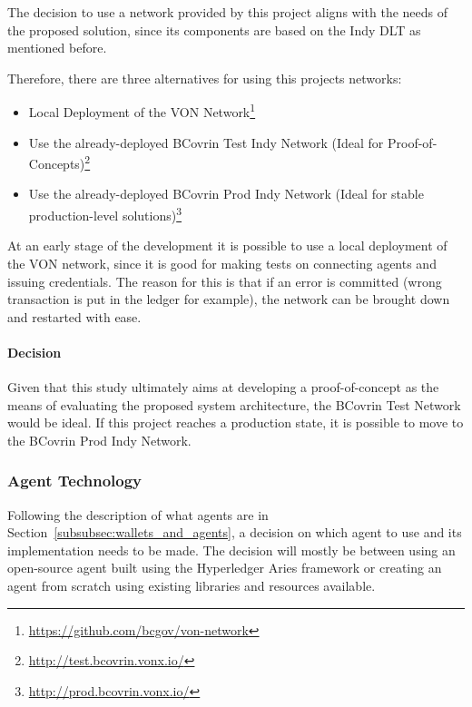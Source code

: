 The decision to use a network provided by this project aligns with the needs of the proposed solution, since its components are based on the Indy DLT as mentioned before. 

Therefore, there are three alternatives for using this projects networks:

\begin{itemize}
    \item Local Deployment of the VON Network\footnote{\url{https://github.com/bcgov/von-network}}
    \item Use the already-deployed BCovrin Test Indy Network (Ideal for Proof-of-Concepts)\footnote{\url{http://test.bcovrin.vonx.io/}}
    \item Use the already-deployed BCovrin Prod Indy Network (Ideal for stable production-level solutions)\footnote{\url{http://prod.bcovrin.vonx.io/}}
\end{itemize}

At an early stage of the development it is possible to use a local deployment of the VON network, since it is good for making tests on connecting agents and issuing credentials. The reason for this is that if an error is committed (wrong transaction is put in the ledger for example), the network can be brought down and restarted with ease.


\paragraph{Decision}

Given that this study ultimately aims at developing a proof-of-concept as the means of evaluating the proposed system architecture, the BCovrin Test Network would be ideal. If this project reaches a production state, it is possible to move to the BCovrin Prod Indy Network.

\subsubsection{Agent Technology}
\label{subsubsec:agent_technology}

Following the description of what agents are in Section~\ref{subsubsec:wallets_and_agents}, a decision on which agent to use and its implementation needs to be made.
The decision will mostly be between using an open-source agent built using the Hyperledger Aries framework or creating an agent from scratch using existing libraries and resources available.

